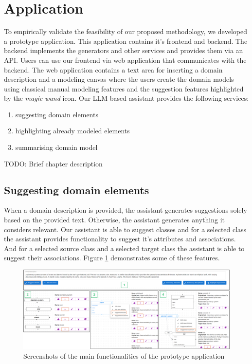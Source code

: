 \section{Application}

To empirically validate the feasibility of our proposed methodology, we developed a prototype application. This application contains it's frontend and backend. The backend  implements the generators and other services and provides them via an API. Users can use our frontend via web application that communicates with the backend. The web application contains a text area for inserting a domain description and a modeling canvas where the users create the domain models using classical manual modeling features and the suggestion features highlighted by the \textit{magic wand} icon. Our LLM based assistant provides the following services:
\begin{enumerate}
\item suggesting domain elements
\item highlighting already modeled elements
\item summarising domain model \\
\end{enumerate}

\noindent{}TODO: Brief chapter description \\


\subsection{Suggesting domain elements}

When a domain description is provided, the assistant generates suggestions solely based on the provided text. Otherwise, the assistant generates anything it considers relevant. Our assistant is able to suggest classes and for a selected class the assistant provides functionality to suggest it's attributes and associations. And for a selected source class and a selected target class the assistant is able to suggest their associations. Figure \ref{fig:assistant-features} demonstrates some of these features.

\begin{figure}[!h]
    \centering
    \includegraphics[scale=0.22]{img/assistant-features.png}
    \caption{\centering Screenshots of the main functionalities of the prototype application}
    \label{fig:assistant-features}
\end{figure}

